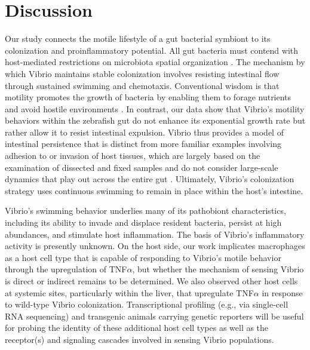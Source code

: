 \section{Discussion}
Our study connects the motile lifestyle of a gut bacterial symbiont to its colonization and proinflammatory potential. All gut bacteria must contend with host-mediated restrictions on microbiota spatial organization \cite{donaldson_gut_2015,tropini_gut_2017,byndloss_healthy_2018}. The mechanism by which Vibrio maintains stable colonization involves resisting intestinal flow through sustained swimming and chemotaxis. Conventional wisdom is that motility promotes the growth of bacteria by enabling them to forage nutrients and avoid hostile environments \cite{wei_population_2011,stecher_motility_2008,rivera-chavez_energy_2016}. In contrast, our data show that Vibrio's motility behaviors within the zebrafish gut do not enhance its exponential growth rate but rather allow it to resist intestinal expulsion. Vibrio thus provides a model of intestinal persistence that is distinct from more familiar examples involving adhesion to or invasion of host tissues, which are largely based on the examination of dissected and fixed samples and do not consider large-scale dynamics that play out across the entire gut \cite{mcloughlin_host_2016,schluter_adhesion_2015,donaldson_gut_2018}. Ultimately, Vibrio's colonization strategy uses continuous swimming to remain in place within the host's intestine.

Vibrio's swimming behavior underlies many of its pathobiont characteristics, including its ability to invade and displace resident bacteria, persist at high abundances, and stimulate host inflammation. The basis of Vibrio's inflammatory activity is presently unknown. On the host side, our work implicates macrophages as a host cell type that is capable of responding to Vibrio's motile behavior through the upregulation of TNF$\alpha$, but whether the mechanism of sensing Vibrio is direct or indirect remains to be determined. We also observed other host cells at systemic sites, particularly within the liver, that upregulate TNF$\alpha$ in response to wild-type Vibrio colonization. Transcriptional profiling (e.g., via single-cell RNA sequencing) and transgenic animals carrying genetic reporters will be useful for probing the identity of these additional host cell types as well as the receptor(s) and signaling cascades involved in sensing Vibrio populations.  

